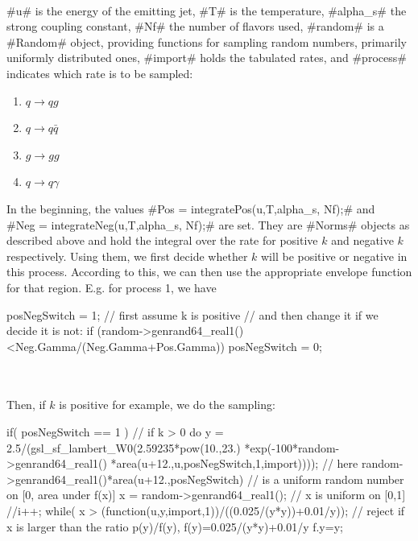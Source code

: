 ~\\
#u# is the energy of the emitting jet, #T# is the temperature, #alpha_s# the strong
coupling constant, #Nf# the number of flavors used, #random# is a #Random# object, 
providing functions for sampling random numbers, primarily uniformly distributed ones,
#import# holds the tabulated rates, and #process# indicates which rate is to be
sampled:
\begin{enumerate}
  \item $q\rightarrow qg$
  \item $q\rightarrow q\bar{q}$
  \item $g\rightarrow gg$
  \item $q\rightarrow q\gamma$
\end{enumerate}
In the beginning, the values #Pos = integratePos(u,T,alpha_s, Nf);# and \\
#Neg = integrateNeg(u,T,alpha_s, Nf);# are set.
They are #Norms# objects as described above and hold the integral over the 
rate for positive $k$ and negative $k$ respectively. Using them, we first decide 
whether $k$ will be positive or negative in this process. According to this, we can
then use the appropriate envelope function for that region.
E.g. for process 1, we have\\

\begin{boxedverbatim} 
  posNegSwitch = 1; // first assume k is positive 
  // and then change it if we decide it is not:  
  if (random->genrand64_real1()<Neg.Gamma/(Neg.Gamma+Pos.Gamma)) posNegSwitch = 0;
\end{boxedverbatim}\\

~\\
Then, if $k$ is positive for example, we do the sampling:\\

\begin{boxedverbatim} 
 if( posNegSwitch == 1 ) // if k > 0
	{
	  do
	    {
	      y = 2.5/(gsl_sf_lambert_W0(2.59235*pow(10.,23.)
                                         *exp(-100*random->genrand64_real1()
                                         *area(u+12.,u,posNegSwitch,1,import))));
	      // here random->genrand64_real1()*area(u+12.,posNegSwitch) 
	      // is a uniform random number on [0, area under f(x)]
	      x = random->genrand64_real1();
	      // x is uniform on [0,1]
	      //i++;
	    } while( x > (function(u,y,import,1))/((0.025/(y*y))+0.01/y)); 
	  // reject if x is larger than the ratio p(y)/f(y), f(y)=0.025/(y*y)+0.01/y
	  f.y=y;
	}
\end{boxedverbatim}\\

